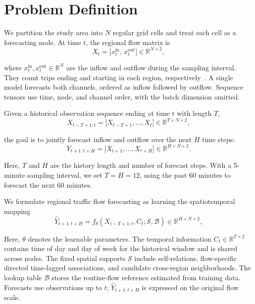 
\section{Problem Definition}\label{sec:problem-definition}

We partition the study area into \(N\) regular grid cells and treat each cell as a forecasting node. At time \(t\), the regional flow matrix is
\begin{equation}
\label{eq:flow}
X_t = \bigl[x_t^{\mathrm{in}},\,x_t^{\mathrm{out}}\bigr]
\in \mathbb{R}^{N\times 2},
\end{equation}

where \(x_t^{\mathrm{in}},x_t^{\mathrm{out}}\in\mathbb{R}^{N}\) are the inflow and outflow during the sampling interval. They count trips ending and starting in each region, respectively~\cite{ref32}. A single model forecasts both channels, ordered as inflow followed by outflow. Sequence tensors use time, node, and channel order, with the batch dimension omitted.

Given a historical observation sequence ending at time \(t\) with length \(T\),
\begin{equation}
\label{eq:history}
X_{t-T+1:t} = \bigl[X_{t-T+1},\ldots,X_t\bigr]
\in \mathbb{R}^{T\times N\times 2},
\end{equation}

the goal is to jointly forecast inflow and outflow over the next \(H\) time steps:
\begin{equation}
\label{eq:future}
Y_{t+1:t+H} = \bigl[X_{t+1},\ldots,X_{t+H}\bigr]
\in \mathbb{R}^{H\times N\times 2}.
\end{equation}

Here, \(T\) and \(H\) are the history length and number of forecast steps. With a 5-minute sampling interval, we set \(T=H=12\), using the past 60 minutes to forecast the next 60 minutes.

We formulate regional traffic flow forecasting as learning the spatiotemporal mapping
\begin{equation}
\label{eq:mapping}
\widehat{Y}_{t+1:t+H}
= f_{\theta}\!\left(X_{t-T+1:t},C_t;\mathcal{S},\mathcal{B}\right)
\in \mathbb{R}^{H\times N\times 2},
\end{equation}

Here, \(\theta\) denotes the learnable parameters. The temporal information \(C_t\in\mathbb{R}^{T\times 2}\) contains time of day and day of week for the historical window and is shared across nodes. The fixed spatial supports \(\mathcal{S}\) include self-relations, flow-specific directed time-lagged associations, and candidate cross-region neighborhoods. The lookup table \(\mathcal{B}\) stores the routine-flow reference estimated from training data. Forecasts use observations up to \(t\); \(\widehat{Y}_{t+1:t+H}\) is expressed on the original flow scale.

